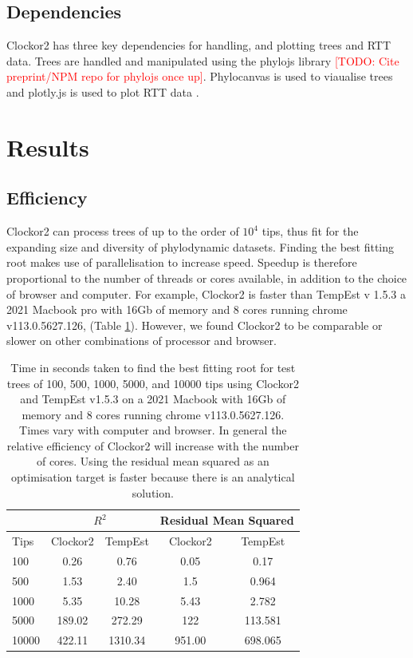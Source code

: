 \documentclass{article}
\begin{document}
\subsection*{Dependencies}
Clockor2 has three key dependencies for handling, and plotting trees and RTT data. Trees are handled and manipulated using the phylojs library \textcolor{red}{[TODO: Cite preprint/NPM repo for phylojs once up]}. Phylocanvas is used to viaualise trees and plotly.js is used to plot RTT data \citep{abudahab_phylocanvasgl_2021,plotly}.

\section*{Results}
\subsection*{Efficiency}
Clockor2 can process trees of up to the order of $10^4$ tips, thus fit for the expanding size and diversity of phylodynamic datasets. Finding the best fitting root makes use of parallelisation to increase speed. Speedup is therefore proportional to the number of threads or cores available, in addition to the choice of browser and computer. For example, Clockor2 is faster than TempEst v 1.5.3 a 2021 Macbook pro with 16Gb of memory and 8 cores running chrome v113.0.5627.126, (Table \ref{tab:bfr}). However, we found Clockor2 to be comparable or slower on other combinations of processor and browser. 
\begin{table}[H]
    \centering
    \caption{Time in seconds taken to find the best fitting root for test trees of 100, 500, 1000, 5000, and 10000 tips using Clockor2 and TempEst v1.5.3 on a 2021 Macbook with 16Gb of memory and 8 cores running chrome v113.0.5627.126. Times vary with computer and browser. In general the relative efficiency of Clockor2 will increase with the number of cores. Using the residual mean squared as an optimisation target is faster because there is an analytical solution.}
    \begin{tabular}{|l|c|c|c|c|}
    		\cline{2-5}
    		\multicolumn{1}{c}{}		 & \multicolumn{2}{|c|}{$R^{2}$} & \multicolumn{2}{|c|}{Residual Mean Squared}  \\
    		\hline
        Tips    & Clockor2  & TempEst & Clockor2  & TempEst   \\
        \hline
        100 & 0.26 & 0.76 & 0.05 & 0.17 \\
        500 & 1.53 & 2.40 & 1.5 & 0.964 \\
        1000 & 5.35 & 10.28 & 5.43 & 2.782 \\
        5000 & 189.02 & 272.29 & 122 & 113.581 \\
        10000 & 422.11 & 1310.34 & 951.00 & 698.065 \\
        \hline
    \end{tabular}
    \label{tab:bfr}
\end{table}
\end{document}
